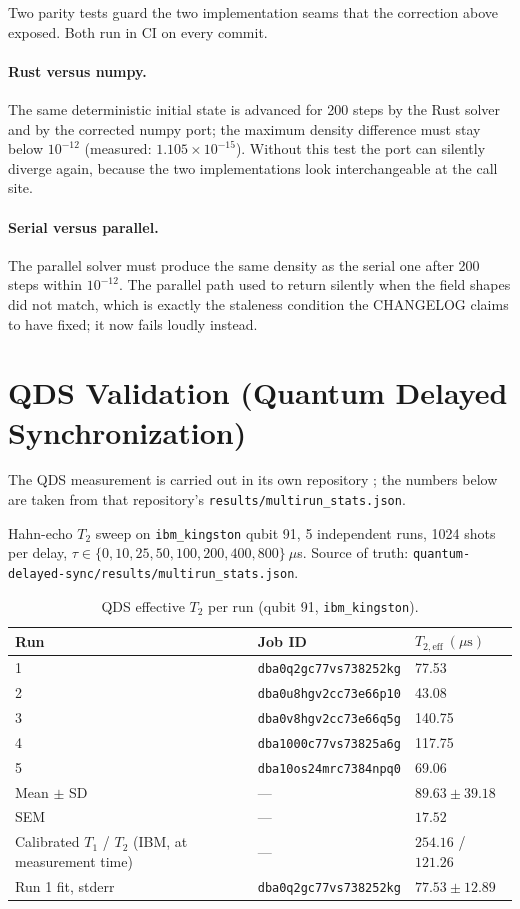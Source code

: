 \documentclass[sigconf,anonymous=false]{acmart}
\begin{document}
\label{sec:parity}

Two parity tests guard the two implementation seams that the correction above exposed. Both run
in CI on every commit.

\paragraph{Rust versus numpy.} The same deterministic initial state is advanced for 200 steps by
the Rust solver and by the corrected numpy port; the maximum density difference must stay below
$10^{-12}$ (measured: $1.105\times 10^{-15}$). Without this test the port can silently diverge
again, because the two implementations look interchangeable at the call site.

\paragraph{Serial versus parallel.} The parallel solver must produce the same density as the
serial one after 200 steps within $10^{-12}$. The parallel path used to return silently when the
field shapes did not match, which is exactly the staleness condition the CHANGELOG claims to have
fixed; it now fails loudly instead.

\section{QDS Validation (Quantum Delayed Synchronization)}

The QDS measurement is carried out in its own repository \cite{QDS}; the numbers below are
taken from that repository's \texttt{results/multirun\_stats.json}.

Hahn-echo $T_2$ sweep on \texttt{ibm\_kingston} qubit 91, 5 independent runs,
1024 shots per delay, $\tau \in \{0, 10, 25, 50, 100, 200, 400, 800\}\ \mu$s.
Source of truth: \texttt{quantum-delayed-sync/results/multirun\_stats.json}.

\begin{table}[h]
\centering
\caption{QDS effective $T_2$ per run (qubit 91, \texttt{ibm\_kingston}).}
\label{tab:qds}
\begin{tabular}{lll}
\toprule
Run & Job ID & $T_{2,\text{eff}}\ (\mu\text{s})$ \\
\midrule
1 & \texttt{dba0q2gc77vs738252kg} & 77.53 \\
2 & \texttt{dba0u8hgv2cc73e66p10} & 43.08 \\
3 & \texttt{dba0v8hgv2cc73e66q5g} & 140.75 \\
4 & \texttt{dba1000c77vs73825a6g} & 117.75 \\
5 & \texttt{dba10os24mrc7384npq0} & 69.06 \\
\midrule
Mean $\pm$ SD & --- & $89.63 \pm 39.18$ \\
SEM & --- & $17.52$ \\
\midrule
Calibrated $T_1$ / $T_2$ (IBM, at measurement time) & --- & $254.16$ / $121.26$ \\
Run 1 fit, stderr & \texttt{dba0q2gc77vs738252kg} & $77.53 \pm 12.89$ \\
\bottomrule
\end{tabular}
\end{table}
\end{document}
